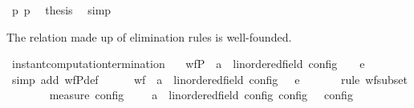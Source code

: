 \begin{isabellebody}
\ p{}\ p{}\ \isamarkupfalse%
\ {\isacharquery}thesis\ \isamarkupfalse%
\ simp\isanewline
{}\isamarkupfalse%
%
\endisatagproof
{\isafoldproof}%
%
\isadelimproof
%
\endisadelimproof
%
\begin{isamarkuptext}%
The relation made up of elimination rules is well-founded.%
\end{isamarkuptext}\isamarkuptrue%
\isamarkupfalse%
\ instant{\isacharunderscore}computation{\isacharunderscore}termination{\isacharcolon}\isanewline
\ \ \ {\isacartoucheopen}wfP\ {\isacharparenleft}{\isasymlambda}{\isacharparenleft}{\isasymS}\ {\isacharprime}a\ {\isacharcolon}{\isacharcolon}\ linordered{\isacharunderscore}field\ config{\isacharparenright}\ {\isasymS}\ {\isacharparenleft}{\isasymS}\ \ {\isasymhookrightarrow}\isactrlsub e\isactrlsup {\isasymleftarrow}\ \ {\isasymS}\isanewline
%
\isadelimproof
\ \ %
\endisadelimproof
%
\isatagproof
{}\isamarkupfalse%
\ {\isacharparenleft}simp\ add{\isacharcolon}\ wfP{\isacharunderscore}def{\isacharparenright}\isanewline
\ \ \ \ \isamarkupfalse%
\ {\isacartoucheopen}wf\ {\isacharbraceleft}{\isacharparenleft}{\isacharparenleft}{\isasymS}\ {\isacharprime}a\ {\isacharcolon}{\isacharcolon}\ linordered{\isacharunderscore}field\ config{\isacharparenright}{\isacharcomma}\ {\isasymS}\ {\isasymS}\ {\isasymhookrightarrow}\isactrlsub e\isactrlsup {\isasymleftarrow}\ {\isasymS}\isanewline
\ \ \ \ \isamarkupfalse%
\ {\isacharparenleft}rule\ wf{\isacharunderscore}subset{\isacharparenright}\isanewline
\ \ \ \ \ \ \isamarkupfalse%
\ {\isacartoucheopen}measure\ {\isasymmu}\isactrlsub c\isactrlsub o\isactrlsub n\isactrlsub f\isactrlsub i\isactrlsub g\ {\isacharequal}\ {\isacharbraceleft}\ {\isacharparenleft}{\isasymS}\ {\isacharparenleft}{\isasymS}\ {\isacharprime}a\ {\isacharcolon}{\isacharcolon}\ linordered{\isacharunderscore}field\ config{\isacharparenright}{\isacharparenright}{\isachardot}\ {\isasymmu}\isactrlsub c\isactrlsub o\isactrlsub n\isactrlsub f\isactrlsub i\isactrlsub g\ {\isasymS}\ {\isacharless}\ {\isasymmu}\isactrlsub c\isactrlsub o\isactrlsub n\isactrlsub f\isactrlsub i\isactrlsub g\ {\isasymS}\ {\isacharbraceright}{\isacartoucheclose}\isanewline

\end{isabellebody}
